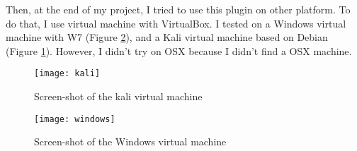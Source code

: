 Then, at the end of my project, I tried to use this plugin on other platform. To do that, I use virtual machine with VirtualBox. I tested on a Windows virtual machine with W7 (Figure \ref{fig:windows}), and a Kali virtual machine based on Debian (Figure \ref{fig:kali}). However, I didn't try on OSX because I didn't find a OSX machine.

\begin{figure}[h]
  \centering
  \texttt{[image: kali]}
  \caption{Screen-shot of the kali virtual machine}
  \label{fig:kali}
\end{figure}

\begin{figure}[h]
  \centering
  \texttt{[image: windows]}
  \caption{Screen-shot of the Windows virtual machine}
  \label{fig:windows}
\end{figure}


